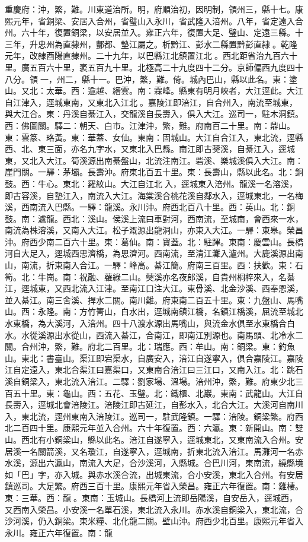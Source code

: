 \begin{pinyinscope}
重慶府：沖，繁，難。川東道治所。明，府順治初，因明制，領州三，縣十七。康熙元年，省銅梁、安居入合州，省璧山入永川，省武隆入涪州。八年，省定遠入合州。六十年，復置銅梁，以安居並入。雍正六年，復置大足、璧山、定遠三縣。十三年，升忠州為直隸州，酆都、墊江屬之。析黔江、彭水二縣置黔彭直隸。乾隆元年，改隸酉陽直隸州。二十九年，以巴縣江北鎮置江北。西北距省治九百六十里。廣五百六十里，袤五百九十里。北極高二十九度四十二分。京師偏西九度四十八分。領一，州二，縣十一。巴沖，繁，難。倚。城內巴山，縣以此名。東：塗山。又北：太華。西：逾越、縉雲。南：霖峰。縣東有明月峽者，大江逕此。大江自江津入，逕城東南，又東北入江北。嘉陵江即涪江，自合州入，南流至城東，與大江合。東：丹溪自綦江入，交龍溪自長壽入，俱入大江。巡司一，駐木洞鎮。西：佛圖關。驛二：朝天、白市。江津沖，繁，難。府南百二十里。南：鼎山。東：雲篆、珞黃。東：華蓋、女仙。東南：固城山。大江自合江入，東北流，逕縣西、北、東三面，亦名九字水，又東北入巴縣。南江即古僰溪，自綦江入，逕城東，又北入大江。筍溪源出南綦盤山，北流注南江。砦溪、樂城溪俱入大江。南：崖門關。一驛：茅壩。長壽沖。府東北百五十里。東：長壽山，縣以此名。北：銅鼓。西：牛心。東北：羅紋山。大江自江北入，逕城東入涪州。龍溪一名溶溪，即古容溪，自墊江入，南流入大江。海棠溪合桃花溪自鄰水入，逕城東北，一名梅溪，西南流入巴縣。一驛：龍溪。永川沖。府西北百八十里。西：英山。北：銅鼓。南：瀘龍。西北：溪山。侯溪上流曰車對河，西南流，至城南，會西來一水，南流為株溶溪，又南入大江。松子溉源出龍洞山，亦東入大江。一驛：東皋。榮昌沖。府西少南二百六十里。東：葛仙。南：寶蓋。北：駐蹕。東南：慶雲山。長橋河自大足入，逕城西思濟橋，為思濟河。西南流，至清江灘入瀘州。大鹿溪源出南山，南流，折東南入合江。一驛：峰高。綦江簡。府南三百里。西：扶歡。東：石筍。北：牛崗。南：祝融、蘿綠二山。僰溪亦名夜郎溪，自貴州桐梓來入，名綦江，逕城東，又西北流入江津。至南江口注大江。東骨溪、北金沙溪、西奉恩溪，並入綦江。南三舍溪、捍水二關。南川難。府東南二百五十里。東：九盤山、馬嘴山。西：永隆。南：方竹箐山，白水出，逕城南鎮江橋，名鎮江橋溪，屈流至城北水東橋，為大溪河，入涪州。四十八渡水源出馬嘴山，與流金水俱至水東橋合白水。水從溪源出水從山，西流入綦江，合南江，即南江別源也。南馬頭、北冷水二關。合州沖，繁，難。府北二百里。北：瑞應。西：牟山。南：銅梁。東：釣魚山。東北：書臺山。渠江即宕渠水，自廣安入，涪江自遂寧入，俱合嘉陵江。嘉陵江自定遠入，東北合渠江曰嘉渠口，又東南合涪江曰三江口，又南入江。北：跳石溪自銅梁入，東北流入涪江。二驛：劉家場、溫場。涪州沖，繁，難。府東少北三百五十里。東：龜山。西：五花、玉璧。北：鐵櫃、北巖。東南：武龍山。大江自長壽入，逕城北會涪陵江。涪陵江即古延江，自彭水入，北合大江。大溪河自南川入，東北流，逕州東南入涪陵江。巡司一，駐武隆鎮。一驛：涪陵。銅梁繁。府西北二百四十里。康熙元年並入合州。六十年復置。西：六瀛。東：新開山。南：雙山。西北有小銅梁山，縣以此名。涪江自遂寧入，逕城東北，又東南流入合州。安居溪一名關箭溪，又名瓊江，自遂寧入，逕城南，折東北流入涪江。馬灘河一名赤水溪，源出六瀛山，南流入大足，合沙溪河，入縣城。合巴川河，東南流，繞縣境如「巴」字，亦入城。與赤水溪合流，出城東流，合小安溪，東北入合州。有安居鎮巡司。大足繁。府西三百十里。康熙元年省入榮昌。雍正六年復置。南：雞棲。東：三華。西：龍。東南：玉城山。長橋河上流即岳陽溪，自安岳入，逕城西，又西南入榮昌。小安溪一名單石溪，東北流入永川。赤水溪自銅梁入，東北流，合沙河溪，仍入銅梁。東米糧、北化龍二關。壁山沖。府西少北百里。康熙元年省入永川。雍正六年復置。南：龍
\end{pinyinscope}
